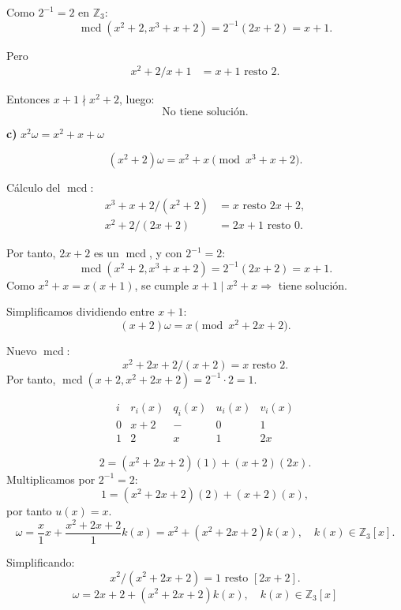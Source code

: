 \documentclass[a4paper,12pt]{article}
\begin{document}
\begin{ejercicio}[title=Ejercicio 59]

Como $2^{-1} = 2$ en $\mathbb{Z}_3$:
\[
\operatorname{mcd}(x^2 + 2, x^3 + x + 2) = 2^{-1}(2x + 2) = x + 1.
\]

Pero
\[
\begin{aligned}
x^2 + 2 / x+1 &= x + 1 \text{ resto } 2.
\end{aligned}
\]

Entonces $x + 1 \nmid x^2 + 2$, luego:
\[
\boxed{\text{No tiene solución.}}
\]

\vspace{0.5em}

\textbf{c)} $x^2\omega = x^2 + x + \omega$

\[
(x^2 + 2)\omega = x^2 + x \pmod{x^3 + x + 2}.
\]

Cálculo del $\operatorname{mcd}$:
\[
\begin{aligned}
x^3 + x + 2 / (x^2 + 2) &= x \text{ resto } \boxed{2x + 2}, \\
x^2 + 2 / (2x + 2) &= 2x + 1 \text{ resto } 0.
\end{aligned}
\]

Por tanto, $2x + 2$ es un $\operatorname{mcd}$, y con $2^{-1} = 2$:
\[
\operatorname{mcd}(x^2 + 2, x^3 + x + 2) = 2^{-1}(2x + 2) = x + 1.
\]
Como $x^2 + x = x(x + 1)$, se cumple $x + 1 \mid x^2 + x \Rightarrow$ tiene solución.

Simplificamos dividiendo entre $x + 1$:
\[
(x + 2)\omega = x \pmod{x^2 + 2x + 2}.
\]

Nuevo $\operatorname{mcd}$:
\[
x^2 + 2x + 2 / (x + 2) = x \text{ resto } \boxed{2}.
\]
Por tanto, $\operatorname{mcd}(x + 2, x^2 + 2x + 2) = 2^{-1}\cdot2 = 1$.

\[
\begin{array}{c|c|c|c|c}
i & r_i(x) & q_i(x) & u_i(x) & v_i(x) \\ \hline
0 & x + 2 & - & 0 & 1 \\
1 & \boxed{2} & x & 1 & 2x
\end{array}
\]

\[
\boxed{2} = (x^2 + 2x + 2)(1) + (x + 2)(2x).
\]
Multiplicamos por $2^{-1} = 2$:
\[
1 = (x^2 + 2x + 2)(2) + (x + 2)(x),
\]
por tanto $u(x) = x$.
\[
\omega = \frac{x}{1}x + \frac{x^2 + 2x + 2}{1}k(x) = x^2 + (x^2 + 2x + 2)k(x), \quad k(x) \in \mathbb{Z}_3[x].
\]

Simplificando:
\[
x^2 / (x^2 + 2x + 2) = 1 \text{ resto } [2x + 2].
\]
\[
\boxed{\omega = 2x + 2 + (x^2 + 2x + 2)k(x), \quad k(x) \in \mathbb{Z}_3[x]}
\]
\end{ejercicio}
\end{document}
